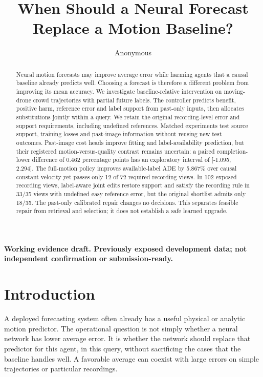 \documentclass[10pt,twocolumn,letterpaper]{article}
\title{When Should a Neural Forecast Replace a Motion Baseline?}\author{Anonymous}
\begin{document}
\raggedbottom\maketitle
\textbf{Working evidence draft. Previously exposed development data; not independent confirmation or submission-ready.}


\begin{abstract}

Neural motion forecasts may improve average error while harming agents that a causal baseline already predicts well. Choosing a forecast is therefore a different problem from improving its mean accuracy. We investigate baseline-relative intervention on moving-drone crowd trajectories with partial future labels. The controller predicts benefit, positive harm, reference error and label support from past-only inputs, then allocates substitutions jointly within a query. We retain the original recording-level error and support requirements, including undefined references. Matched experiments test source support, training losses and past-image information without reusing new test outcomes. Past-image cost heads improve fitting and label-availability prediction, but their registered motion-versus-quality contrast remains uncertain: a paired completion-lower difference of 0.462 percentage points has an exploratory interval of [-1.095, 2.294]. The full-motion policy improves available-label ADE by 5.867\% over causal constant velocity yet passes only 12 of 72 required recording views. In 102 exposed recording views, label-aware joint edits restore support and satisfy the recording rule in 33/35 views with undefined easy reference error, but the original shortlist admits only 18/35. The past-only calibrated repair changes no decisions. This separates feasible repair from retrieval and selection; it does not establish a safe learned upgrade.


\end{abstract}

\section{Introduction}

A deployed forecasting system often already has a useful physical or analytic motion predictor. The operational question is not simply whether a neural network has lower average error. It is whether the network should replace that predictor for this agent, in this query, without sacrificing the cases that the baseline handles well. A favorable average can coexist with large errors on simple trajectories or particular recordings.
\end{document}
